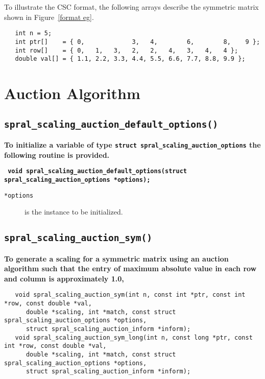 To illustrate the CSC format, the following arrays describe the symmetric
matrix shown in Figure~\ref{format eg}.
\begin{verbatim}
   int n = 5;
   int ptr[]    = { 0,             3,   4,        6,        8,    9 };
   int row[]    = { 0,   1,   3,   2,   2,   4,   3,   4,   4 };
   double val[] = { 1.1, 2.2, 3.3, 4.4, 5.5, 6.6, 7.7, 8.8, 9.9 };
\end{verbatim}



\section{Auction Algorithm}

\subsection{\texttt{spral\_scaling\_auction\_default\_options()}}

\textbf{To initialize a variable of type
   \texttt{struct spral\_scaling\_auction\_options} the following routine
   is provided.}

\vspace*{0.3cm}
\noindent
\textbf{\texttt{
   \hspace*{0.3cm} void spral\_scaling\_auction\_default\_options(struct spral\_scaling\_auction\_options *options);
}}
\vspace*{-0.4cm}

\begin{description}
   \item[\texttt{*options}] is the instance to be initialized.
\end{description}


\subsection{\texttt{spral\_scaling\_auction\_sym()}}

\textbf{\noindent
   To generate a scaling for a symmetric matrix using an auction algorithm such that the entry of maximum absolute value in each row and column is approximately 1.0,
}
\vspace*{-0.1cm}
\begin{verbatim}
   void spral_scaling_auction_sym(int n, const int *ptr, const int *row, const double *val,
      double *scaling, int *match, const struct spral_scaling_auction_options *options,
      struct spral_scaling_auction_inform *inform);
   void spral_scaling_auction_sym_long(int n, const long *ptr, const int *row, const double *val,
      double *scaling, int *match, const struct spral_scaling_auction_options *options,
      struct spral_scaling_auction_inform *inform);
\end{verbatim}

